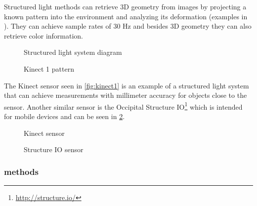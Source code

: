 Structured light methods can retrieve 3D geometry from images by projecting a known pattern into the environment and analyzing its deformation (examples in ). They can achieve sample rates of 30 Hz and besides 3D geometry they can also retrieve color information.


\begin{figure}[H]
	\begin{floatrow}[2]
		{\caption[Structured light system diagram]{Structured light system diagram\protect\footnotemark}\label{fig:structured-light}}
		{\caption[Kinect 1  pattern]{Kinect 1  pattern\protect\footnotemark}\label{fig:kinect1-ir}}
	\end{floatrow}
\end{figure}


The Kinect sensor seen in \cref{fig:kinect1} is an example of a structured light system that can achieve measurements with millimeter accuracy for objects close to the sensor. Another similar sensor is the Occipital Structure IO\footnote{\url{http://structure.io/}} which is intended for mobile devices and can be seen in \cref{fig:structure-io}.


\begin{figure}[H]
	\begin{floatrow}[2]
		{\caption[Kinect 2 sensor]{Kinect sensor\protect\footnotemark}\label{fig:kinect1}}
		{\caption[Structure IO sensor]{Structure IO sensor\protect\footnotemark}\label{fig:structure-io}}
	\end{floatrow}
\end{figure}


\subsubsection{ methods}\label{sec:tof-methods}

